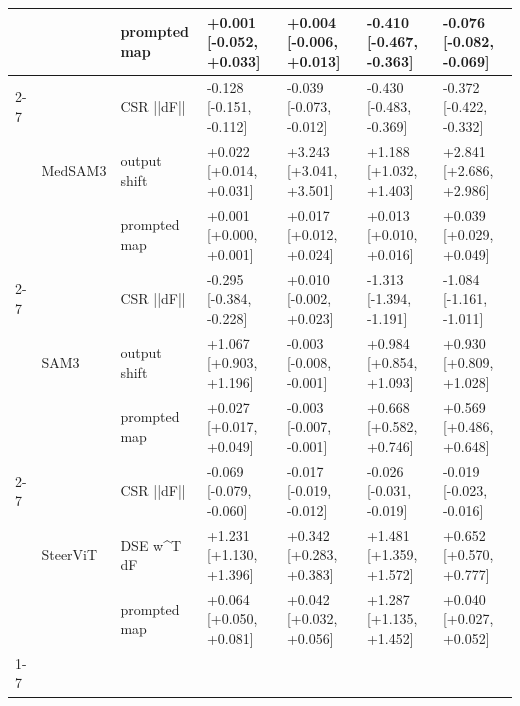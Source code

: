 \begin{tabular}{lllllll}
 &  & prompted map & +0.001 [-0.052, +0.033] & +0.004 [-0.006, +0.013] & -0.410 [-0.467, -0.363] & -0.076 [-0.082, -0.069] \\
\cline{2-7}
 & \multirow[t]{3}{*}{MedSAM3} & CSR  ||dF|| & -0.128 [-0.151, -0.112] & -0.039 [-0.073, -0.012] & -0.430 [-0.483, -0.369] & -0.372 [-0.422, -0.332] \\
 &  & output shift & +0.022 [+0.014, +0.031] & +3.243 [+3.041, +3.501] & +1.188 [+1.032, +1.403] & +2.841 [+2.686, +2.986] \\
 &  & prompted map & +0.001 [+0.000, +0.001] & +0.017 [+0.012, +0.024] & +0.013 [+0.010, +0.016] & +0.039 [+0.029, +0.049] \\
\cline{2-7}
 & \multirow[t]{3}{*}{SAM3} & CSR  ||dF|| & -0.295 [-0.384, -0.228] & +0.010 [-0.002, +0.023] & -1.313 [-1.394, -1.191] & -1.084 [-1.161, -1.011] \\
 &  & output shift & +1.067 [+0.903, +1.196] & -0.003 [-0.008, -0.001] & +0.984 [+0.854, +1.093] & +0.930 [+0.809, +1.028] \\
 &  & prompted map & +0.027 [+0.017, +0.049] & -0.003 [-0.007, -0.001] & +0.668 [+0.582, +0.746] & +0.569 [+0.486, +0.648] \\
\cline{2-7}
 & \multirow[t]{3}{*}{SteerViT} & CSR  ||dF|| & -0.069 [-0.079, -0.060] & -0.017 [-0.019, -0.012] & -0.026 [-0.031, -0.019] & -0.019 [-0.023, -0.016] \\
 &  & DSE  w^T dF & +1.231 [+1.130, +1.396] & +0.342 [+0.283, +0.383] & +1.481 [+1.359, +1.572] & +0.652 [+0.570, +0.777] \\
 &  & prompted map & +0.064 [+0.050, +0.081] & +0.042 [+0.032, +0.056] & +1.287 [+1.135, +1.452] & +0.040 [+0.027, +0.052] \\
\cline{1-7} \cline{2-7}
\bottomrule
\end{tabular}
